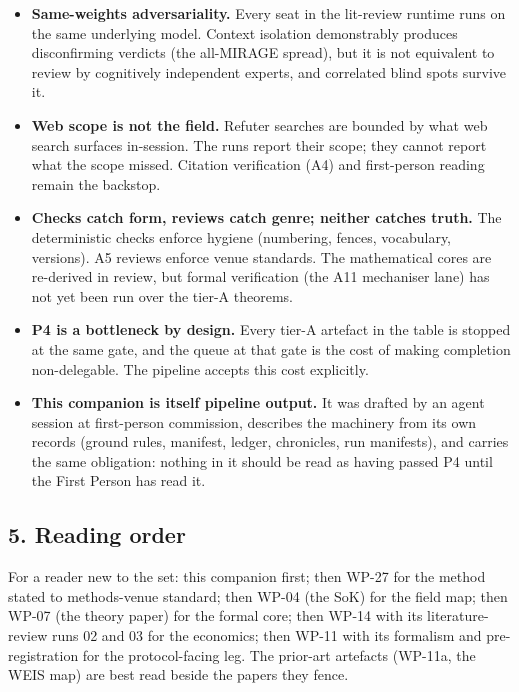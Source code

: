 \documentclass[
  11pt,
]{article}
\providecommand{\tightlist}{%
  \setlength{\itemsep}{0pt}\setlength{\parskip}{0pt}}
\begin{document}
\begin{itemize}
\tightlist
\item
  \textbf{Same-weights adversariality.} Every seat in the lit-review
  runtime runs on the same underlying model. Context isolation
  demonstrably produces disconfirming verdicts (the all-MIRAGE spread),
  but it is not equivalent to review by cognitively independent experts,
  and correlated blind spots survive it.
\item
  \textbf{Web scope is not the field.} Refuter searches are bounded by
  what web search surfaces in-session. The runs report their scope; they
  cannot report what the scope missed. Citation verification (A4) and
  first-person reading remain the backstop.
\item
  \textbf{Checks catch form, reviews catch genre; neither catches
  truth.} The deterministic checks enforce hygiene (numbering, fences,
  vocabulary, versions). A5 reviews enforce venue standards. The
  mathematical cores are re-derived in review, but formal verification
  (the A11 mechaniser lane) has not yet been run over the tier-A
  theorems.
\item
  \textbf{P4 is a bottleneck by design.} Every tier-A artefact in the
  table is stopped at the same gate, and the queue at that gate is the
  cost of making completion non-delegable. The pipeline accepts this
  cost explicitly.
\item
  \textbf{This companion is itself pipeline output.} It was drafted by
  an agent session at first-person commission, describes the machinery
  from its own records (ground rules, manifest, ledger, chronicles, run
  manifests), and carries the same obligation: nothing in it should be
  read as having passed P4 until the First Person has read it.
\end{itemize}

\subsection{5. Reading order}\label{reading-order}

For a reader new to the set: this companion first; then WP-27 for the
method stated to methods-venue standard; then WP-04 (the SoK) for the
field map; then WP-07 (the theory paper) for the formal core; then WP-14
with its literature-review runs 02 and 03 for the economics; then WP-11
with its formalism and pre-registration for the protocol-facing leg. The
prior-art artefacts (WP-11a, the WEIS map) are best read beside the
papers they fence.
\end{document}
